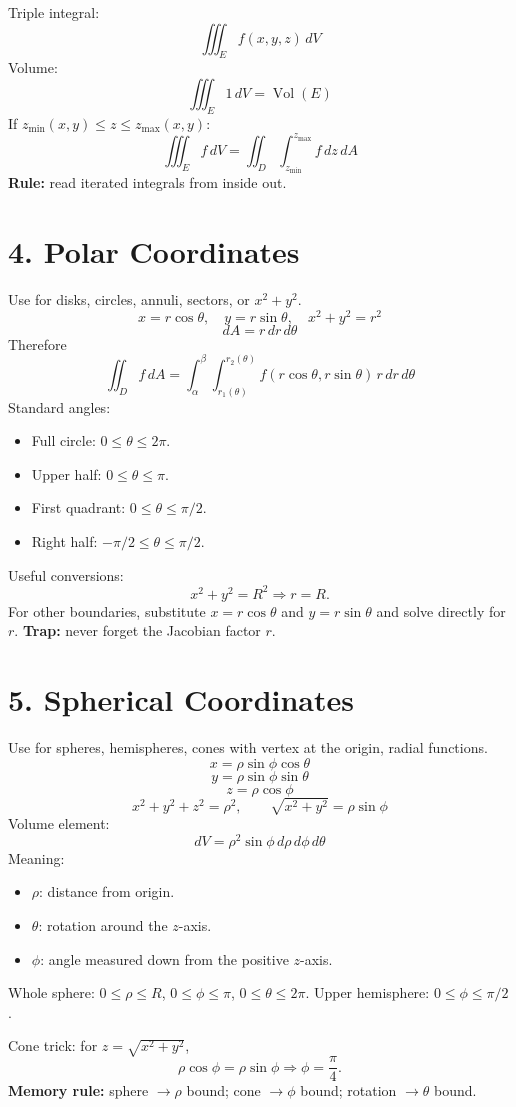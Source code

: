 \documentclass[10pt,a4paper]{article}
\newcommand{\boxeq}[1]{\[\boxed{#1}\]}
\begin{document}
\begin{multicols}{2}
Triple integral:
\boxeq{\iiint_E f(x,y,z)\,dV}
Volume:
\boxeq{\iiint_E1\,dV=\operatorname{Vol}(E)}
If $z_{\min}(x,y)\le z\le z_{\max}(x,y)$:
\boxeq{\iiint_E f\,dV=\iint_D\int_{z_{\min}}^{z_{\max}} f\,dz\,dA}
\textbf{Rule:} read iterated integrals from inside out.

\section*{4. Polar Coordinates}
Use for disks, circles, annuli, sectors, or $x^2+y^2$.
\boxeq{x=r\cos\theta,\quad y=r\sin\theta,\quad x^2+y^2=r^2}
\boxeq{dA=r\,dr\,d\theta}
Therefore
\boxeq{\iint_D f\,dA=\int_{\alpha}^{\beta}\int_{r_1(\theta)}^{r_2(\theta)}f(r\cos\theta,r\sin\theta)\,r\,dr\,d\theta}
Standard angles:
\begin{itemize}
\item Full circle: $0\le\theta\le2\pi$.
\item Upper half: $0\le\theta\le\pi$.
\item First quadrant: $0\le\theta\le\pi/2$.
\item Right half: $-\pi/2\le\theta\le\pi/2$.
\end{itemize}
Useful conversions:
\[
x^2+y^2=R^2\Rightarrow r=R.
\]
For other boundaries, substitute $x=r\cos\theta$ and $y=r\sin\theta$ and solve directly for $r$.
\textbf{Trap:} never forget the Jacobian factor $r$.

\section*{5. Spherical Coordinates}
Use for spheres, hemispheres, cones with vertex at the origin, radial functions.
\boxeq{x=\rho\sin\phi\cos\theta}
\boxeq{y=\rho\sin\phi\sin\theta}
\boxeq{z=\rho\cos\phi}
\boxeq{x^2+y^2+z^2=\rho^2,\qquad \sqrt{x^2+y^2}=\rho\sin\phi}
Volume element:
\boxeq{dV=\rho^2\sin\phi\,d\rho\,d\phi\,d\theta}
Meaning:
\begin{itemize}
\item $\rho$: distance from origin.
\item $\theta$: rotation around the $z$-axis.
\item $\phi$: angle measured down from the positive $z$-axis.
\end{itemize}
Whole sphere: $0\le\rho\le R$, $0\le\phi\le\pi$, $0\le\theta\le2\pi$.
Upper hemisphere: $0\le\phi\le\pi/2$.

Cone trick: for $z=\sqrt{x^2+y^2}$,
\[
\rho\cos\phi=\rho\sin\phi\Rightarrow \phi=\frac{\pi}{4}.
\]
\textbf{Memory rule:} sphere $\to\rho$ bound; cone $\to\phi$ bound; rotation $\to\theta$ bound.


\end{multicols}
\end{document}
